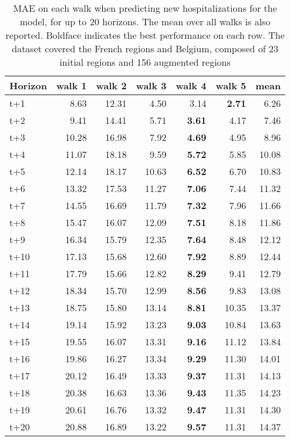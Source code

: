 \begin{table}[H]
\centering
\caption{MAE on each walk when predicting new hospitalizations for the model, for up to 20 horizons. The mean over all walks is also reported. Boldface indicates the best performance on each row. The dataset covered the French regions and Belgium, composed of 23 initial regions and 156 augmented regions }
\label{tab:MAE_walk_encoder_decoder}
\begin{tabular}{lrrrrrr}
\toprule
Horizon &  walk 1 &  walk 2 &  walk 3 &  walk 4 &  walk 5 &  mean \\
\midrule
t+1  & 8.63  & 12.31  & 4.50  & 3.14  & \textbf{2.71}  & 6.26  \\
t+2  & 9.41  & 14.41  & 5.71  & \textbf{3.61}  & 4.17  & 7.46  \\
t+3  & 10.28  & 16.98  & 7.92  & \textbf{4.69}  & 4.95  & 8.96  \\
t+4  & 11.07  & 18.18  & 9.59  & \textbf{5.72}  & 5.85  & 10.08  \\
t+5  & 12.14  & 18.17  & 10.63  & \textbf{6.52}  & 6.70  & 10.83  \\
t+6  & 13.32  & 17.53  & 11.27  & \textbf{7.06}  & 7.44  & 11.32  \\
t+7  & 14.55  & 16.69  & 11.79  & \textbf{7.32}  & 7.96  & 11.66  \\
t+8  & 15.47  & 16.07  & 12.09  & \textbf{7.51}  & 8.18  & 11.86  \\
t+9  & 16.34  & 15.79  & 12.35  & \textbf{7.64}  & 8.48  & 12.12  \\
t+10  & 17.13  & 15.68  & 12.60  & \textbf{7.92}  & 8.89  & 12.44  \\
t+11  & 17.79  & 15.66  & 12.82  & \textbf{8.29}  & 9.41  & 12.79  \\
t+12  & 18.34  & 15.70  & 12.99  & \textbf{8.56}  & 9.83  & 13.08  \\
t+13  & 18.75  & 15.80  & 13.14  & \textbf{8.81}  & 10.35  & 13.37  \\
t+14  & 19.14  & 15.92  & 13.23  & \textbf{9.03}  & 10.84  & 13.63  \\
t+15  & 19.55  & 16.07  & 13.31  & \textbf{9.16}  & 11.12  & 13.84  \\
t+16  & 19.86  & 16.27  & 13.34  & \textbf{9.29}  & 11.30  & 14.01  \\
t+17  & 20.12  & 16.49  & 13.33  & \textbf{9.37}  & 11.31  & 14.13  \\
t+18  & 20.38  & 16.63  & 13.36  & \textbf{9.43}  & 11.35  & 14.23  \\
t+19  & 20.61  & 16.76  & 13.32  & \textbf{9.47}  & 11.31  & 14.30  \\
t+20  & 20.88  & 16.89  & 13.22  & \textbf{9.57}  & 11.31  & 14.37  \\

\bottomrule
\end{tabular}
\end{table}
